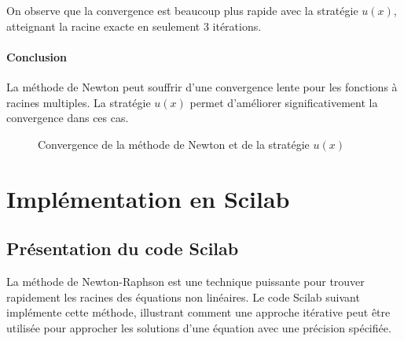 \documentclass{article}
\begin{document}
On observe que la convergence est beaucoup plus rapide avec la stratégie \( u(x) \), atteignant la racine exacte en seulement 3 itérations.

\paragraph{Conclusion}
La méthode de Newton peut souffrir d'une convergence lente pour les fonctions à racines multiples. La stratégie \( u(x) \) permet d'améliorer significativement la convergence dans ces cas.

\begin{figure}[h!]
\centering
{}
\caption{Convergence de la méthode de Newton et de la stratégie \( u(x) \)}
\end{figure}

\section{Implémentation en Scilab}
\subsection{Présentation du code Scilab}
La méthode de Newton-Raphson est une technique puissante pour trouver rapidement les racines des équations non linéaires. Le code Scilab suivant implémente cette méthode, illustrant comment une approche itérative peut être utilisée pour approcher les solutions d'une équation avec une précision spécifiée.
\end{document}
